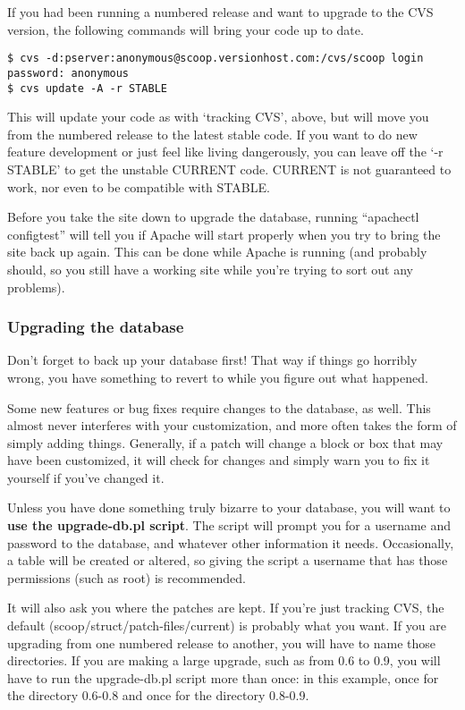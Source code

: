 If you had been running a numbered release and want to upgrade to the CVS version, the following commands will bring your code up to date.

\begin{verbatim}
$ cvs -d:pserver:anonymous@scoop.versionhost.com:/cvs/scoop login
password: anonymous
$ cvs update -A -r STABLE
\end{verbatim}

This will update your code as with `tracking CVS', above, but will move you from the numbered release to the latest stable code. If you want to do new feature development or just feel like living dangerously, you can leave off the `-r STABLE' to get the unstable CURRENT code. CURRENT is not guaranteed to work, nor even to be compatible with STABLE.

Before you take the site down to upgrade the database, running ``apachectl configtest'' will tell you if Apache will start properly when you try to bring the site back up again.  This can be done while Apache is running (and probably should, so you still have a working site while you're trying to sort out any problems).

\subsubsection{Upgrading the database}
\label{upgrading-db}

Don't forget to back up your database first! That way if things go horribly wrong, you have something to revert to while you figure out what happened.

Some new features or bug fixes require changes to the database, as well.  This almost never interferes with your customization, and more often takes the form of simply adding things.  Generally, if a patch will change a block or box that may have been customized, it will check for changes and simply warn you to fix it yourself if you've changed it.

Unless you have done something truly bizarre to your database, you will want to {\bf use the upgrade-db.pl script}.  The script will prompt you for a username and password to the database, and whatever other information it needs.  Occasionally, a table will be created or altered, so giving the script a username that has those permissions (such as root) is recommended.

It will also ask you where the patches are kept.  If you're just tracking CVS, the default (scoop/struct/patch-files/current) is probably what you want.  If you are upgrading from one numbered release to another, you will have to name those directories.  If you are making a large upgrade, such as from 0.6 to 0.9, you will have to run the upgrade-db.pl script more than once: in this example, once for the directory 0.6-0.8 and once for the directory 0.8-0.9.

